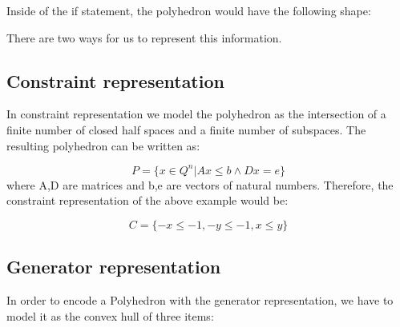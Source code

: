 Inside of the if statement, the polyhedron would have the following shape:

\begin{center}
\end{center}

There are two ways for us to represent this information.
\subsection{Constraint representation}
In constraint representation we model the polyhedron as the intersection of a finite number of closed half spaces and a finite number of subspaces. The resulting polyhedron can be written as:

\begin{equation}
	P=\{x\in Q^n |Ax\leq b \wedge Dx=e\}
\end{equation}
where A,D are matrices and b,e are vectors of natural numbers. Therefore, the constraint representation of the above example would be:

\begin{equation}
	C = \{-x \leq -1, -y \leq -1, x\leq y \} 
\end{equation}

\subsection{Generator representation}
In order to encode a Polyhedron with the generator representation, we have to model it as the convex hull of three items: 

